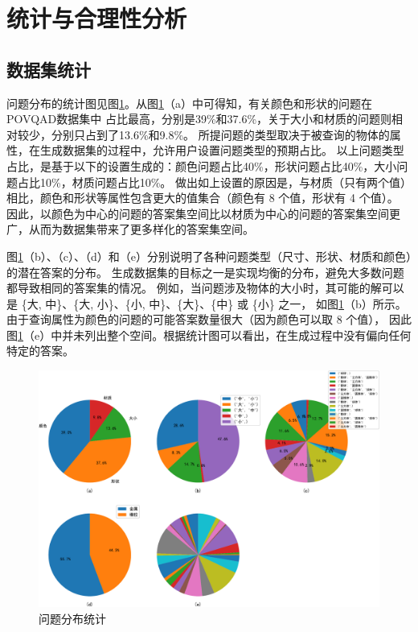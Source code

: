 \section{统计与合理性分析}
\subsection{数据集统计}
问题分布的统计图见图\ref{fig:question_statistics}。从图\ref{fig:question_statistics}（a）中可得知，有关颜色和形状的问题在POVQAD数据集中
占比最高，分别是39\%和37.6\%，关于大小和材质的问题则相对较少，分别只占到了13.6\%和9.8\%。
所提问题的类型取决于被查询的物体的属性，在生成数据集的过程中，允许用户设置问题类型的预期占比。
以上问题类型占比，是基于以下的设置生成的：颜色问题占比40\%，形状问题占比40\%，大小问题占比10\%，材质问题占比10\%。
做出如上设置的原因是，与材质（只有两个值）相比，颜色和形状等属性包含更大的值集合（颜色有 8 个值，形状有 4 个值）。
因此，以颜色为中心的问题的答案集空间比以材质为中心的问题的答案集空间更广，从而为数据集带来了更多样化的答案集空间。

图\ref{fig:question_statistics}（b）、（c）、（d）和（e）分别说明了各种问题类型（尺寸、形状、材质和颜色）的潜在答案的分布。
生成数据集的目标之一是实现均衡的分布，避免大多数问题都导致相同的答案集的情况。
例如，当问题涉及物体的大小时，其可能的解可以是
 \{大, 中\}、\{大, 小\}、\{小, 中\}、\{大\}、\{中\} 或 \{小\} 之一，
 如图\ref{fig:question_statistics}（b）所示。由于查询属性为颜色的问题的可能答案数量很大（因为颜色可以取 8 个值），
 因此图\ref{fig:question_statistics}（e）中并未列出整个空间。根据统计图可以看出，在生成过程中没有偏向任何特定的答案。
\begin{figure}[h]
    \centering
    \includegraphics[width=\textwidth]{figures/question_distribution-crop.pdf}
    \caption{问题分布统计}
    \label{fig:question_statistics}
\end{figure}


